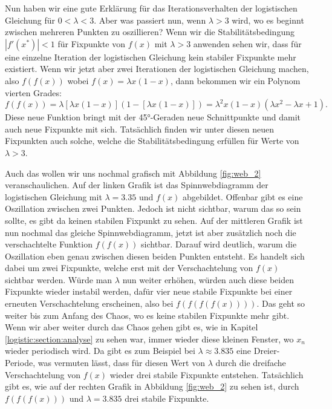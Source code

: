 Nun haben wir eine gute Erklärung für das Iterationsverhalten
der logistischen Gleichung für $0 < \lambda < 3$. 
Aber was passiert nun, wenn $\lambda > 3$ wird,
wo es beginnt zwischen mehreren Punkten zu oszillieren?
Wenn wir die Stabilitätsbedingung $|f'(x^*)| < 1$
für Fixpunkte von $f(x)$ mit $\lambda > 3$ anwenden sehen wir,
dass für eine einzelne Iteration der logistischen 
Gleichung kein stabiler Fixpunkte mehr existiert. 
Wenn wir jetzt aber zwei Iterationen der logistischen
Gleichung machen, also 
$f(f(x))$ wobei $f(x)=\lambda x (1-x)$,
dann bekommen wir ein Polynom vierten Grades:
\begin{equation}
    f(f(x))
    =
    \lambda [\lambda x (1-x)] (1-[\lambda x (1-x)])
    =
    \lambda^2 x (1-x) (\lambda x^2 - \lambda x + 1).
\end{equation}
Diese neue Funktion bringt mit der 45°-Geraden 
neue Schnittpunkte und damit auch neue Fixpunkte mit sich.
Tatsächlich finden wir unter diesen neuen Fixpunkten 
auch solche, welche die Stabilitätsbedingung erfüllen für
Werte von $\lambda > 3$.

Auch das wollen wir uns nochmal grafisch mit
Abbildung \ref{fig:web_2} veranschaulichen.  
Auf der linken Grafik ist das Spinnwebdiagramm der 
logistischen Gleichung mit $\lambda = 3.35$ und
$f(x)$ abgebildet. 
Offenbar gibt es eine Oszillation zwischen zwei Punkten.
Jedoch ist nicht sichtbar, warum das so sein sollte,
es gibt da keinen stabilen Fixpunkt zu sehen.
Auf der mittleren Grafik ist nun nochmal das gleiche
Spinnwebdiagramm, jetzt ist aber zusätzlich noch
die verschachtelte Funktion $f(f(x))$ sichtbar.
Darauf wird deutlich, warum die Oszillation eben genau 
zwischen diesen beiden Punkten entsteht. 
Es handelt sich dabei um zwei Fixpunkte, welche erst 
mit der Verschachtelung von $f(x)$ sichtbar werden.
%
Würde man $\lambda$ nun weiter erhöhen, würden auch
diese beiden Fixpunkte wieder instabil werden,
dafür vier neue stabile Fixpunkte bei einer erneuten
Verschachtelung erscheinen, 
also bei $f(f(f(f(x))))$. 
Das geht so weiter bis zum Anfang des Chaos, wo
es keine stabilen Fixpunkte mehr gibt. 
Wenn wir aber weiter durch das Chaos gehen gibt es, 
wie in Kapitel \ref{logistic:section:analyse}
zu sehen war, immer wieder diese kleinen Fenster,
wo $x_n$ wieder periodisch wird. 
Da gibt es zum Beispiel bei
$\lambda \approx 3.835$ eine Dreier-Periode,
was vermuten lässt, dass für diesen Wert
von $\lambda$ durch die dreifache Verschachtelung
von $f(x)$ wieder drei stabile Fixpunkte entstehen.
Tatsächlich gibt es, wie auf der rechten Grafik 
in Abbildung \ref{fig:web_2} zu sehen ist,
durch $f(f(f(x)))$ und $\lambda = 3.835$ drei stabile Fixpunkte. 


\FloatBarrier

